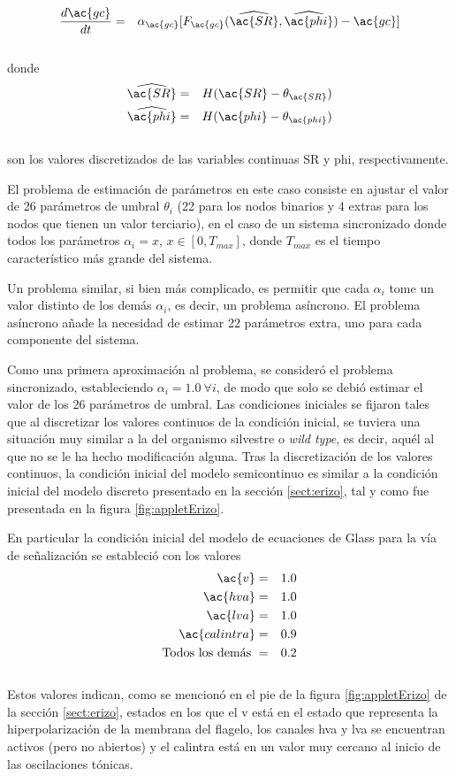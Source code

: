 \begin{eqnarray}\label{eqn:glasscGMP}
\frac{d\ac{gc}}{dt} & = & \alpha_{\ac{gc}} [F_{\ac{gc}}(\widehat{\ac{SR}}, \widehat{\ac{phi}}) - \ac{gc}]
\end{eqnarray}
\\
donde
\begin{eqnarray}
\widehat{\ac{SR}} & = & H(\ac{SR} - \theta_{\ac{SR}})\\
\widehat{\ac{phi}} & = & H(\ac{phi} - \theta_{\ac{phi}})
\end{eqnarray}
\\
son los valores discretizados de las variables continuas \acf{SR} y \acf{phi}, respectivamente.

El problema de estimación de parámetros en este caso consiste en ajustar el valor de 26 parámetros de umbral $\theta_i$ (22 para los nodos binarios y 4 extras para los nodos que tienen un valor terciario), en el caso de un sistema sincronizado donde todos los parámetros $\alpha_i=x$, $x \in [0,T_{max}]$, donde $T_{max}$ es el tiempo característico más grande del sistema. 

Un problema similar, si bien más complicado, es permitir que cada $\alpha_i$ tome un valor distinto de los demás $\alpha_i$, es decir, un problema asíncrono. El problema asíncrono añade la necesidad de estimar 22 parámetros extra, uno para cada componente del sistema.

Como una primera aproximación al problema, se consideró el problema sincronizado, estableciendo $\alpha_i = 1.0\ \forall i$, de modo que solo se debió estimar el valor de los 26 parámetros de umbral. Las condiciones iniciales se fijaron tales que al discretizar los valores continuos de la condición inicial, se tuviera una situación muy similar a la del organismo silvestre o \emph{wild type}, es decir, aquél al que no se le ha hecho modificación alguna. Tras la discretización de los valores continuos, la condición inicial del modelo semicontinuo es similar a la condición inicial del modelo discreto presentado en la sección \ref{sect:erizo}, tal y como fue presentada en la figura \ref{fig:appletErizo}.

En particular la condición inicial del modelo de ecuaciones de Glass para la vía de señalización se estableció con los valores
\begin{eqnarray*}
\ac{v} & = & 1.0\\
\ac{hva} & = & 1.0\\
\ac{lva} & = & 1.0\\
\ac{calintra} & = & 0.9\\
\text{Todos los demás } & = & 0.2 
\end{eqnarray*}
\\
Estos valores indican, como se mencionó en el pie de la figura \ref{fig:appletErizo} de la sección \ref{sect:erizo}, estados en los que el \acf{v} está en el estado que representa la hiperpolarización de la membrana del flagelo, los canales \acf{hva} y \acf{lva} se encuentran activos (pero no abiertos) y el \acf{calintra} está en un valor muy cercano al inicio de las oscilaciones tónicas.

